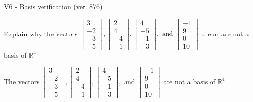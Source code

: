 \begin{exercise}
  \begin{exerciseTitle}V6 - Basis verification (ver. 876)\end{exerciseTitle}
  \begin{exerciseStatement}
    Explain why the vectors \(\left[\begin{array}{r}
3 \\
-2 \\
-3 \\
-5
\end{array}\right] , \left[\begin{array}{r}
2 \\
4 \\
-4 \\
-1
\end{array}\right] , \left[\begin{array}{r}
4 \\
-5 \\
-1 \\
-3
\end{array}\right] , \text{ and } \left[\begin{array}{r}
-1 \\
9 \\
0 \\
10
\end{array}\right]\) are or are not a basis of \(\mathbb{R}^4\)	


  \end{exerciseStatement}
  \begin{exerciseAnswer}
   The vectors \(\left[\begin{array}{r}
3 \\
-2 \\
-3 \\
-5
\end{array}\right] , \left[\begin{array}{r}
2 \\
4 \\
-4 \\
-1
\end{array}\right] , \left[\begin{array}{r}
4 \\
-5 \\
-1 \\
-3
\end{array}\right] , \text{ and } \left[\begin{array}{r}
-1 \\
9 \\
0 \\
10
\end{array}\right]\) 
  	 are not  a basis of \(\mathbb{R}^4\).
  


  \end{exerciseAnswer}
\end{exercise}